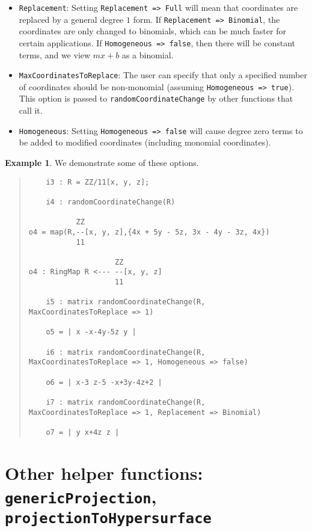 \documentclass[11pt]{amsart}
\theoremstyle{definition}
\newtheorem{example}{Example}[section]
\begin{document}
\begin{itemize}
\item {\tt Replacement}: Setting {\tt Replacement => Full} will mean that coordinates are replaced by a general degree $1$ form.  If {\tt Replacement => Binomial}, the coordinates are only changed to binomials, which can be much faster for certain applications. If {\tt Homogeneous => false}, then there will be constant terms, and we view $mx + b$ as a binomial.
\item {\tt MaxCoordinatesToReplace}: The user can specify that only a specified number of coordinates should be non-monomial (assuming {\tt Homogeneous => true}).  
  This option is passed to {\tt randomCoordinateChange} by other functions that call it. 		
\item {\tt Homogeneous}:  Setting {\tt Homogeneous => false} will cause degree zero terms to be added to modified coordinates (including monomial coordinates).		
\end{itemize} 
\begin{example}  We demonstrate some of these options.
%
  {{\small\color{blue}
  \begin{quote}
\begin{verbatim}
	i3 : R = ZZ/11[x, y, z];

	i4 : randomCoordinateChange(R)

           ZZ
o4 = map(R,--[x, y, z],{4x + 5y - 5z, 3x - 4y - 3z, 4x})                     
           11

                    ZZ
o4 : RingMap R <--- --[x, y, z]
                    11

	i5 : matrix randomCoordinateChange(R, MaxCoordinatesToReplace => 1)

	o5 = | x -x-4y-5z y |

	i6 : matrix randomCoordinateChange(R, MaxCoordinatesToReplace => 1, Homogeneous => false)

	o6 = | x-3 z-5 -x+3y-4z+2 |

	i7 : matrix randomCoordinateChange(R, MaxCoordinatesToReplace => 1, Replacement => Binomial)

	o7 = | y x+4z z |
\end{verbatim}
\end{quote}
    }}
  
\end{example}
\section{Other helper functions: {\tt genericProjection}, {\tt projectionToHypersurface}}\label{projectionfunctions}
\end{document}
